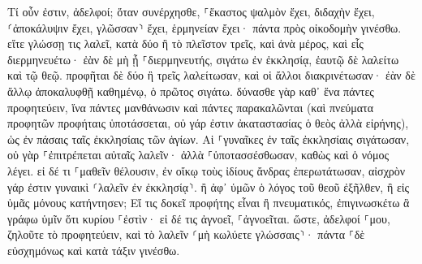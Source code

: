\documentclass[twoside, 9pt]{extreport}
\begin{document}
Τί οὖν ἐστιν, ἀδελφοί; ὅταν συνέρχησθε, ⸀ἕκαστος ψαλμὸν ἔχει, διδαχὴν ἔχει, ⸂ἀποκάλυψιν ἔχει, γλῶσσαν⸃ ἔχει, ἑρμηνείαν ἔχει· πάντα πρὸς οἰκοδομὴν γινέσθω. 
εἴτε γλώσσῃ τις λαλεῖ, κατὰ δύο ἢ τὸ πλεῖστον τρεῖς, καὶ ἀνὰ μέρος, καὶ εἷς διερμηνευέτω· 
ἐὰν δὲ μὴ ᾖ ⸀διερμηνευτής, σιγάτω ἐν ἐκκλησίᾳ, ἑαυτῷ δὲ λαλείτω καὶ τῷ θεῷ. 
προφῆται δὲ δύο ἢ τρεῖς λαλείτωσαν, καὶ οἱ ἄλλοι διακρινέτωσαν· 
ἐὰν δὲ ἄλλῳ ἀποκαλυφθῇ καθημένῳ, ὁ πρῶτος σιγάτω. 
δύνασθε γὰρ καθ᾽ ἕνα πάντες προφητεύειν, ἵνα πάντες μανθάνωσιν καὶ πάντες παρακαλῶνται 
(καὶ πνεύματα προφητῶν προφήταις ὑποτάσσεται, 
οὐ γάρ ἐστιν ἀκαταστασίας ὁ θεὸς ἀλλὰ εἰρήνης), ὡς ἐν πάσαις ταῖς ἐκκλησίαις τῶν ἁγίων. 
Αἱ ⸀γυναῖκες ἐν ταῖς ἐκκλησίαις σιγάτωσαν, οὐ γὰρ ⸀ἐπιτρέπεται αὐταῖς λαλεῖν· ἀλλὰ ⸀ὑποτασσέσθωσαν, καθὼς καὶ ὁ νόμος λέγει. 
εἰ δέ τι ⸀μαθεῖν θέλουσιν, ἐν οἴκῳ τοὺς ἰδίους ἄνδρας ἐπερωτάτωσαν, αἰσχρὸν γάρ ἐστιν γυναικὶ ⸂λαλεῖν ἐν ἐκκλησίᾳ⸃. 
ἢ ἀφ᾽ ὑμῶν ὁ λόγος τοῦ θεοῦ ἐξῆλθεν, ἢ εἰς ὑμᾶς μόνους κατήντησεν; 
Εἴ τις δοκεῖ προφήτης εἶναι ἢ πνευματικός, ἐπιγινωσκέτω ἃ γράφω ὑμῖν ὅτι κυρίου ⸀ἐστὶν· 
εἰ δέ τις ἀγνοεῖ, ⸀ἀγνοεῖται. 
ὥστε, ἀδελφοί ⸀μου, ζηλοῦτε τὸ προφητεύειν, καὶ τὸ λαλεῖν ⸂μὴ κωλύετε γλώσσαις⸃· 
πάντα ⸀δὲ εὐσχημόνως καὶ κατὰ τάξιν γινέσθω. 
\end{document}
